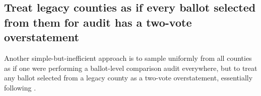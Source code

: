 \documentclass[runningheads]{llncs}
\begin{document}
%

\subsection{Treat legacy counties as if every ballot selected from them for audit has a two-vote overstatement}\label{sec:two-vote-over}
Another simple-but-inefficient approach is to sample uniformly from all counties as if one
were performing a ballot-level comparison audit everywhere,  but to 
treat any ballot
selected from a legacy county as a two-vote overstatement, essentially following \cite{banuelosStark12}.
\end{document}
